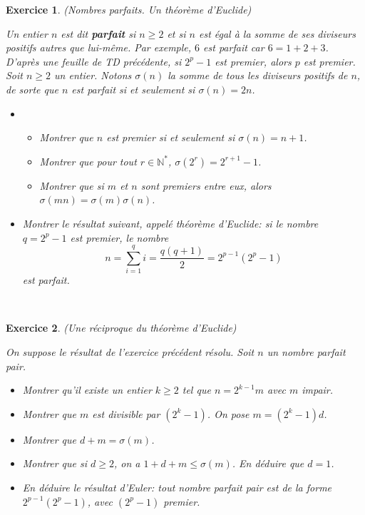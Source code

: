 \documentclass[11pt,a4paper]{article}
\newtheorem{ex}{Exercice}
\begin{document}
\begin{ex}(Nombres parfaits. Un théorème d'Euclide)\

Un entier $n$ est dit \textbf{parfait} si $n \geqslant 2$ et si $n$ est égal à la somme de ses diviseurs positifs autres que lui-même. Par exemple, $6$ est parfait car $6=1+2+3$. \\
D'après une feuille de TD précédente, si $2^p-1$ est premier, alors $p$ est premier. \\
Soit $n\geqslant 2$ un entier. Notons $\sigma(n)$ la somme de tous les diviseurs positifs de $n$, de sorte que $n$ est parfait si et seulement si $\sigma(n)=2n$.
\begin{itemize}
\item[$1.$]\begin{itemize}
\item[$a)$] Montrer que $n$ est premier si et seulement si $\sigma(n)=n+1$.
\item[$b)$] Montrer que pour tout $r \in \mathbb{N}^*$, $\sigma(2^r)=2^{r+1}-1$.
\item[$c)$] Montrer que si $m$ et $n$ sont premiers entre eux, alors $\sigma(mn)=\sigma(m)\sigma(n)$.
\end{itemize}
\item[$2.$] Montrer le résultat suivant, appelé théorème d'Euclide: si le nombre $q=2^p-1$ est premier, le nombre
$$ n=\sum_{i=1}^q i=\frac{q(q+1)}{2}=2^{p-1}(2^p-1) $$
est parfait.
\end{itemize}
\end{ex}

\



\begin{ex}\label{reciproque_euclide}(Une réciproque du théorème d'Euclide)\

On suppose le résultat de l'exercice précédent résolu. Soit $n$ un nombre parfait pair.
\begin{itemize}
\item[$1.$] Montrer qu'il existe un entier $k \geqslant 2$ tel que $n=2^{k-1}m$ avec $m$ impair.
\item[$2.$] Montrer que $m$ est divisible par $(2^k-1)$. On pose $m=(2^k-1)d$.
\item[$3.$] Montrer que $d+m=\sigma(m)$.
\item[$4.$] Montrer que si $d \geqslant 2$, on a $1+d+m \leqslant \sigma(m)$. En déduire que $d=1$.
\item[$5.$] En déduire le résultat d'Euler: tout nombre parfait pair est de la forme $2^{p-1}(2^p-1)$, avec $(2^p-1)$ premier.
\end{itemize}
\end{ex}
\end{document}
